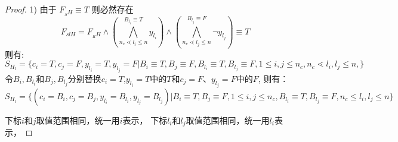 \begin{proof}

1) 由于 $F_{_SH} \equiv T$ 则必然存在
\begin{equation}
F_{slH}=F_{_RH}\wedge
(\bigwedge_{n_c\lessdot l_i\leqslant n}^{B_{l_i}\equiv T} y_{l_i})\wedge
(\bigwedge_{n_c\lessdot l_j\leqslant n}^{B_{l_j}\equiv F}\neg y_{l_j})
 \equiv T
\end{equation}
则有:
\begin{equation}
S_{H_l}=\{c_{i}=T,c_{j}=F,y_{l_i}=T,y_{l_j}=F|
B_i\equiv T, B_j\equiv F,
B_{l_i}\equiv T, B_{l_j}\equiv F,　
1\leqslant i,j\leqslant n_c,
n_c\lessdot l_i,l_j\leqslant n,
\}
\end{equation}
令$B_i,B_{l_i}$和$B_j,B_{l_j}$分别替换$c_{i}=T$,$y_{l_i}=T$中的$T$和$c_{j}=F$、$y_{l_j}=F$中的$F$, 则有：
\begin{equation}\label{4:SHL}
S_{H_l}=\{(c_i=B_i,c_j=B_j,y_{l_i}=B_{l_i},y_{l_j}=B_{l_j})|
B_i\equiv T, B_j\equiv F, 1\leqslant i, j\leqslant n_c,
B_{l_i}\equiv T, B_{l_j}\equiv F, n_c\leqslant l_i, l_j\leqslant n
\}
\end{equation}

下标$i$和$j$取值范围相同，统一用$i$表示，
下标$l_i$和$l_j$取值范围相同，统一用$l_i$表示，


\end{proof}
